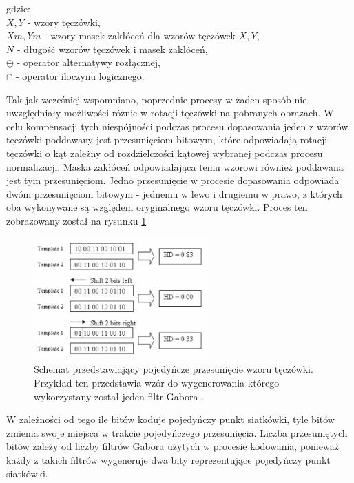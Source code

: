 \documentclass[10pt,polish,a4paper,oneside]{ppfcmthesis}
\begin{document}
\noindent
gdzie:\\
\indent $X, Y$ - wzory tęczówki,\\
\indent $\mathit{Xm}, \mathit{Ym}$ - wzory masek zakłóceń dla wzorów tęczówek $X, Y$,\\
\indent $N$ - długoś\'c wzorów tęczówek i masek zakłóceń,\\
\indent $\oplus$ - operator alternatywy rozłącznej,\\
\indent $\cap$ - operator iloczynu logicznego.\newline

Tak jak wcześniej wspomniano, poprzednie procesy w żaden sposób nie uwzględniały możliwości różnic
w rotacji tęczówki na pobranych obrazach. W celu kompensacji tych niespójności podczas procesu
dopasowania jeden z wzorów tęczówki poddawany jest przesunięciom bitowym, które odpowiadają rotacji
tęczówki o kąt zależny od rozdzielczości kątowej wybranej podczas procesu normalizacji. Maska zakłóceń
odpowiadająca temu wzorowi również poddawana jest tym przesunięciom.
Jedno przesunięcie w procesie dopasowania odpowiada dwóm przesunięciom bitowym - jednemu w lewo i
drugiemu w prawo, z których oba wykonywane są względem oryginalnego wzoru tęczówki. Proces ten
zobrazowany został na rysunku \ref{fig:matchingShifting}

\begin{figure}
  \centering
  \includegraphics[width=0.6\textwidth]{images/matching/shifting.png}
  \caption{Schemat przedstawiający pojedyńcze przesunięcie wzoru tęczówki. Przykład ten przedstawia
  wzór do wygenerowania którego wykorzystany został jeden filtr Gabora \cite{masek}.}
  \label{fig:matchingShifting}
\end{figure}

W zależności od tego ile bitów koduje pojedyńczy punkt siatkówki, tyle bitów zmienia swoje miejsca
w trakcie pojedyńczego przesunięcia. Liczba przesuniętych bitów zależy od liczby filtrów Gabora
użytych w procesie kodowania, ponieważ każdy z takich filtrów wygeneruje dwa bity reprezentujące
pojedyńczy punkt siatkówki.
\end{document}
